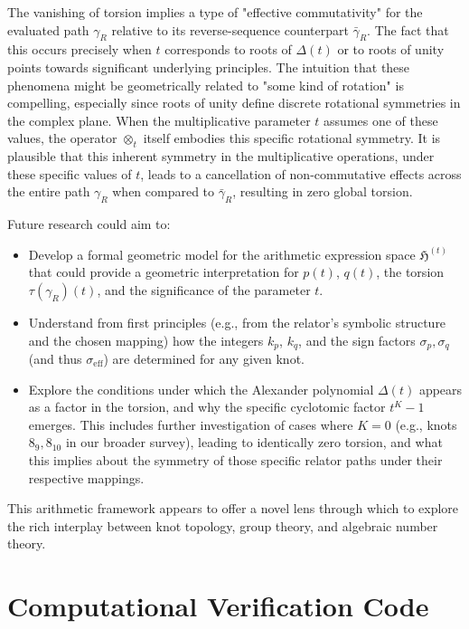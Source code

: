 \documentclass{article}[a4paper,12pt]
\begin{document}
The vanishing of torsion implies a type of "effective commutativity" for the evaluated path $\gamma_R$ relative to its reverse-sequence counterpart $\bar{\gamma}_R$. The fact that this occurs precisely when $t$ corresponds to roots of $\Delta(t)$ or to roots of unity points towards significant underlying principles. The intuition that these phenomena might be geometrically related to "some kind of rotation" is compelling, especially since roots of unity define discrete rotational symmetries in the complex plane. When the multiplicative parameter $t$ assumes one of these values, the operator $\otimes_t$ itself embodies this specific rotational symmetry. It is plausible that this inherent symmetry in the multiplicative operations, under these specific values of $t$, leads to a cancellation of non-commutative effects across the entire path $\gamma_R$ when compared to $\bar{\gamma}_R$, resulting in zero global torsion.

Future research could aim to:
\begin{itemize}
    \item Develop a formal geometric model for the arithmetic expression space $\mathfrak{H}^{(t)}$ that could provide a geometric interpretation for $p(t)$, $q(t)$, the torsion $\tau(\gamma_R)(t)$, and the significance of the parameter $t$.
    \item Understand from first principles (e.g., from the relator's symbolic structure and the chosen mapping) how the integers $k_p$, $k_q$, and the sign factors $\sigma_p, \sigma_q$ (and thus $\sigma_{\text{eff}}$) are determined for any given knot.
    \item Explore the conditions under which the Alexander polynomial $\Delta(t)$ appears as a factor in the torsion, and why the specific cyclotomic factor $t^K-1$ emerges. This includes further investigation of cases where $K=0$ (e.g., knots $8_9, 8_{10}$ in our broader survey), leading to identically zero torsion, and what this implies about the symmetry of those specific relator paths under their respective mappings.
\end{itemize}
This arithmetic framework appears to offer a novel lens through which to explore the rich interplay between knot topology, group theory, and algebraic number theory.

\section{Computational Verification Code}
\end{document}
